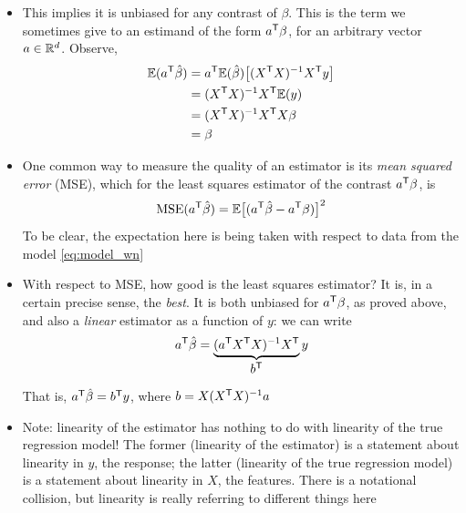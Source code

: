 \documentclass{article}
\begin{document}
\begin{itemize}
\item This implies it is unbiased for any contrast of $\beta$. This is the term 
  we sometimes give to an estimand of the form $a^{\mathsf{T}}\beta$, for an 
  arbitrary vector $a \in \mathbb{R}^d$. Observe, 
  \begin{align*}
  \mathbb{E}(a^{\mathsf{T}} \hat{\beta}) &= a^{\mathsf{T}} \mathbb{E}(\hat{\beta})\big[ (X^{\mathsf{T}} X)^{-1} X^{\mathsf{T}} y \big] \\
  &= (X^{\mathsf{T}} X)^{-1} X^{\mathsf{T}} \mathbb{E}(y) \\
  &= (X^{\mathsf{T}} X)^{-1} X^{\mathsf{T}} X \beta \\
  &= \beta
  \end{align*}

\item One common way to measure the quality of an estimator is its \emph{mean
    squared error} (MSE), which for the least squares estimator  of the contrast $a^{\mathsf{T}} \beta$, is
  \[
  \mathrm{MSE}(a^{\mathsf{T}} \hat{\beta}) = \mathbb{E}\big[ (a^{\mathsf{T}} \hat{\beta} - a^{\mathsf{T}} \beta) \big]^2
  \]
  To be clear, the expectation here is being taken with respect to data from the
  model \eqref{eq:model_wn} 

\item With respect to MSE, how good is the least squares estimator? It is, in a
  certain precise sense, the \emph{best}. It is both unbiased for $a^{\mathsf{T}} \beta$,
  as proved above, and also a \emph{linear} estimator as a function of $y$: we
  can write  
  \[
  a^{\mathsf{T}} \hat{\beta} = \underbrace{(a^{\mathsf{T}} X^{\mathsf{T}} X)^{-1}
    X^{\mathsf{T}}}_{\textstyle \begin{array}{c} b^{\mathsf{T}} \end{array}} y  
  \]
  That is, $a^{\mathsf{T}} \hat{\beta} = b^{\mathsf{T}} y$, where $b = X (X^{\mathsf{T}} X)^{-1} a$ 


\item Note: linearity of the estimator has nothing to do with linearity of the
  true regression model! The former (linearity of the estimator) is a statement
  about linearity in $y$, the response; the latter (linearity of the true
  regression model) is a statement about linearity in $X$, the features. There
  is a notational collision, but linearity is really referring to different
  things here 


\end{itemize}
\end{document}
